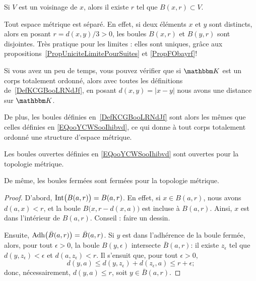 \begin{corollary}\label{CORooUIHJooXAFaJa}\label{ITEMooUIHJooXAFaJa}
  Si \( V\) est un voisinage de \( x\), alors il existe \( r\) tel que \( B(x,r)\subset V\).
\end{corollary}

\begin{remark}  \label{RemQDRooKnwKk}
  Tout espace métrique est séparé. En effet, si deux éléments \( x \) et \( y \) sont distincts, alors en posant \( r = d(x , y) / 3 > 0 \), les boules \( B(x,r) \) et \( B(y,r)\) sont disjointes. Très pratique pour les limites : elles sont uniques, grâce aux propositions~\ref{PropUniciteLimitePourSuites} et \ref{PropFObayrf}!
\end{remark}

\begin{normaltext}
    Si vous avez un peu de temps, vous pouvez vérifier que si \( \eK\) est un corps totalement ordonné, alors avec toutes les définitions de~\ref{DefKCGBooLRNdJf}, en posant \( d(x,y)=| x-y |\) nous avons une distance sur \( \eK\).

    De plus, les boules définies en~\ref{DefKCGBooLRNdJf} sont alors les mêmes que celles définies en \eqref{EQooYCWSooIhibvd}, ce qui donne à tout corps totalement ordonné une structure d'espace métrique.
\end{normaltext}

\begin{proposition}
  Les boules ouvertes définies en \ref{EQooYCWSooIhibvd} sont ouvertes pour la topologie métrique.

  De même, les boules fermées sont fermées pour la topologie métrique.
\end{proposition}

\begin{proof}
  D'abord, \( \operatorname{Int}\bigl( B(a,r) \bigr)=B(a,r)\). En effet, si $x\in B(a,r)$, nous avons $d(a,x)<r$, et la boule $B\big(x,r-d(x,a)\big)$ est incluse à $B(a,r)$. Ainsi, $x$ est dans l'intérieur de $B(a,r)$. Conseil : faire un dessin.

  Ensuite, \( \operatorname{Adh} \bigl(\bar B(a,r)\bigr) = \bar B(a,r)\). Si \( y \) est dans l'adhérence de la boule fermée, alors, pour tout \(\epsilon > 0\), la boule \( B(y, \epsilon) \) intersecte \(\bar B(a,r)\): il existe \( z_\epsilon \) tel que \( d(y,z_\epsilon) < \epsilon \) et \( d(a, z_\epsilon) < r \). Il s'ensuit que, pour tout \(\epsilon > 0\),
  \begin{equation}
    d(y,a) \leq d(y,z_\epsilon) + d(z_\epsilon, a) \leq r + \epsilon;
  \end{equation}
  donc, nécessairement, \( d(y,a) \leq r \), soit \( y \in  \bar B(a,r) \).
\end{proof}

